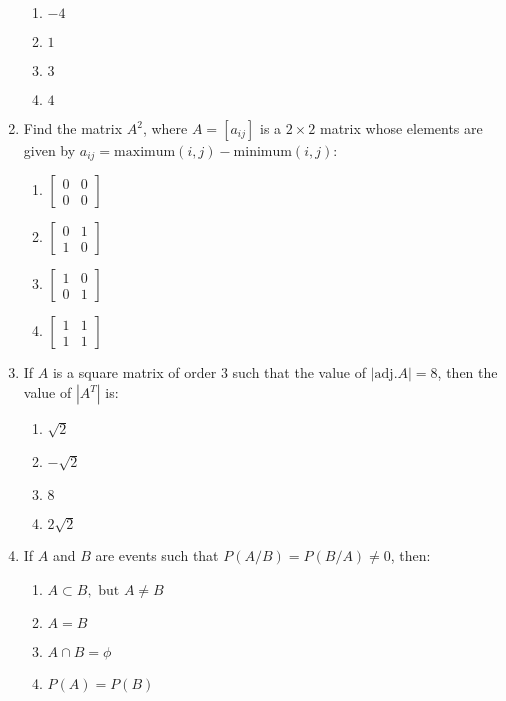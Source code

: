 \documentclass[12pt,-letter paper]{article}
\providecommand{\myvec}[1]{\ensuremath{\begin{bmatrix}#1\end{bmatrix}}}
\providecommand{\brak}[1]{\ensuremath{\left(#1\right)}}
\begin{document}
\begin{enumerate}
     \begin{enumerate}[label={$\brak{\Alph*}$}]                               \item $-4$                                                          \item $1$                                                              \item $3$
        \item $4$                                                         \end{enumerate}                                                   
    \item Find the matrix $A^2$, where $A = [a_{ij}]$ is a \(2 \times 2\) matrix whose elements are given by \(a_{ij} = \text{maximum}(i, j) - \text{minimum}(i, j)\):                                                  \begin{enumerate}[label={$\brak{\Alph*}$}]
       \item $\myvec{0 & 0 \\ 0 & 0}$
        \item $\myvec{0 & 1 \\ 1 & 0}$
        \item $\myvec{1 & 0 \\ 0 & 1}$
        \item $\myvec{1 & 1 \\ 1 & 1}$
    \end{enumerate}

    \item If $A$ is a square matrix of order $3$ such that the value of \(|\text{adj}.A| = 8\), then the value of \(|A^T|\) is:
            \begin{enumerate}[label={$\brak{\Alph*}$}]
        \item $\sqrt{2}$
        \item $-\sqrt{2}$
        \item $8$
        \item $2\sqrt{2}$
    \end{enumerate}

    \item If $A$ and $B$ are events such that $P$\brak{A/B}$ = P$\brak{B/A}$ \neq 0$, then:
            \begin{enumerate}[label={$\brak{\Alph*}$}]
        \item $A \subset B, \text{ but } A \neq B$
        \item $A = B$
        \item $A \cap B = \phi$
        \item $P(A) = P(B)$
    \end{enumerate}
\end{enumerate}
\end{document}
